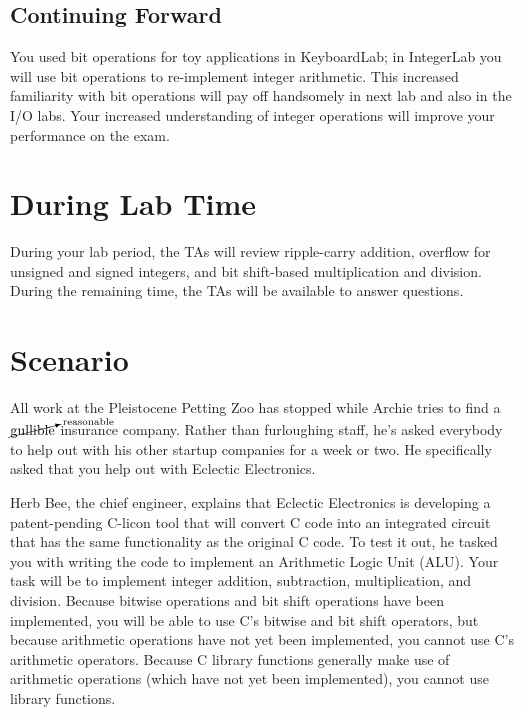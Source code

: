 \subsection*{Continuing Forward}

You used bit operations for toy applications in KeyboardLab; in IntegerLab you
will use bit operations to re-implement integer arithmetic. This increased
familiarity with bit operations will pay off handsomely in next lab and
also in the I/O labs. Your increased understanding of integer operations will
improve your performance on the exam.

\section*{During Lab Time}

During your lab period, the TAs will review ripple-carry addition, overflow for
unsigned and signed integers, and bit shift-based multiplication and division.
During the remaining time, the TAs will be available to answer questions.

\softwareengineeringfrontmatter

\section{Scenario}

All work at the Pleistocene Petting Zoo has stopped while Archie tries to find
a $\cancelto{\mathrm{reasonable}}{\mathrm{gullible}}$ insurance company. Rather
than furloughing staff, he's asked everybody to help out with his other startup
companies for a week or two. He specifically asked that you help out with
Eclectic Electronics.

Herb Bee, the chief engineer, explains that Eclectic Electronics is developing
a patent-pending C-licon tool that will convert C code into an integrated
circuit that has the same functionality as the original C code. To test it out,
he tasked you with writing the code to implement an Arithmetic Logic Unit
(ALU). Your task will be to implement integer addition, subtraction,
multiplication, and division. Because bitwise operations and bit shift
operations have been implemented, you will be able to use C's bitwise and bit
shift operators, but because arithmetic operations have not yet been
implemented, you cannot use C's arithmetic operators. Because C library
functions generally make use of arithmetic operations (which have not yet been
implemented), you cannot use library functions.


